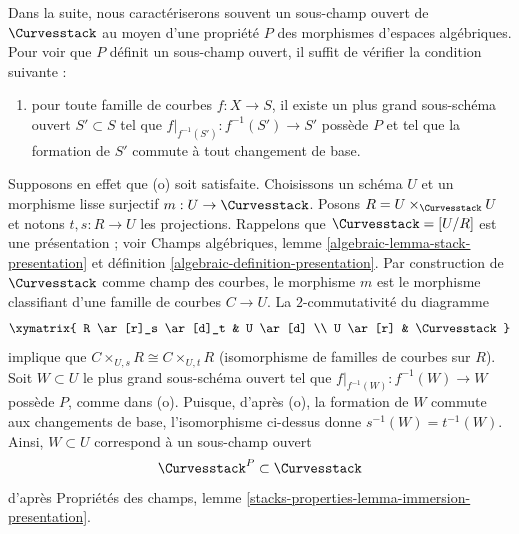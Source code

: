 \noindent
Dans la suite, nous caractériserons souvent un sous-champ ouvert de
$\Curvesstack$ au moyen d'une propriété $P$ des morphismes d'espaces
algébriques. Pour voir que $P$ définit un sous-champ ouvert, il suffit
de vérifier la condition suivante :
\begin{enumerate}
\item[(o)] pour toute famille de courbes $f : X \to S$, il existe
un plus grand sous-schéma ouvert $S' \subset S$ tel que
$f|_{f^{-1}(S')} : f^{-1}(S') \to S'$ possède $P$ et tel que
la formation de $S'$ commute à tout changement de base.
\end{enumerate}
Supposons en effet que (o) soit satisfaite. Choisissons un schéma $U$ et
un morphisme lisse surjectif $m : U \to \Curvesstack$. Posons
$R = U \times_{\Curvesstack} U$ et notons $t, s : R \to U$
les projections. Rappelons que $\Curvesstack = [U/R]$ est une présentation ;
voir Champs algébriques, lemme \ref{algebraic-lemma-stack-presentation} et
définition \ref{algebraic-definition-presentation}.
Par construction de $\Curvesstack$ comme champ des courbes, le morphisme $m$
est le morphisme classifiant d'une famille de courbes $C \to U$. La
$2$-commutativité du diagramme
$$
\xymatrix{
R \ar[r]_s \ar[d]_t & U \ar[d] \\
U \ar[r] & \Curvesstack
}
$$
implique que $C \times_{U, s} R  \cong C \times_{U, t} R$
(isomorphisme de familles de courbes sur $R$). Soit $W \subset U$
le plus grand sous-schéma ouvert tel que
$f|_{f^{-1}(W)} : f^{-1}(W) \to W$ possède $P$, comme dans (o).
Puisque, d'après (o), la formation de $W$ commute aux changements de base,
l'isomorphisme ci-dessus donne $s^{-1}(W) = t^{-1}(W)$.
Ainsi, $W \subset U$ correspond à un sous-champ ouvert
$$
\Curvesstack^P \subset \Curvesstack
$$
d'après Propriétés des champs, lemme
\ref{stacks-properties-lemma-immersion-presentation}.

